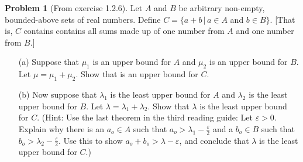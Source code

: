 \documentclass[12pt]{article}
\newcommand{\eps}{\varepsilon}
\theoremstyle{definition}
\newtheorem{problem}{Problem}
\newenvironment{answer}{\par\medskip\bgroup\color{darkblue}}{\egroup\par\medskip}
\begin{document}
\begin{answer}
\end{answer}



\begin{problem}[From exercise 1.2.6]   %
Let $A$ and $B$ be arbitrary non-empty, bounded-above sets of real numbers.  Define
$C=\{a+b\,|\,a\in A$ and $b\in B\}$.  [That is, $C$ contains contains all sums
made up of one number from $A$ and one number from $B$.]
    \begin{enumerate}
    \item[(a)] Suppose that $\mu_1$ is an upper bound for $A$ and $\mu_2$ is an upper bound
        for $B$. Let $\mu = \mu_1+\mu_2$.  Show that is an upper bound for $C$.
    \item[(b)] Now suppose that $\lambda_1$ is the least upper bound for $A$ and
        $\lambda_2$ is the least upper bound for $B$.  Let $\lambda=\lambda_1+ \lambda_2$.
        Show that $\lambda$ is the least upper bound for $C$. (Hint: Use the
        last theorem in the third reading guide:  Let
        $\eps>0$.  Explain why there is an $a_o\in A$ such that $a_o> \lambda_1-\frac{\eps}{2}$
        and a $b_o\in B$ such that $b_o>\lambda_2-\frac{\eps}{2}$.  Use this to show
        $a_o+b_o>\lambda-\eps$, and conclude that $\lambda$ is the least upper bound for $C$.)
    \end{enumerate}
\end{problem}

\begin{answer}
\end{answer}
\end{document}
